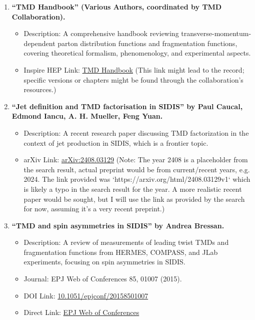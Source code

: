 \documentclass[11pt]{article}
\begin{document}
\begin{enumerate}
  \item \textbf{``TMD Handbook'' (Various Authors, coordinated by TMD Collaboration).}
        \begin{itemize}
          \item Description: A comprehensive handbook reviewing transverse-momentum-dependent parton distribution functions and fragmentation functions, covering
                theoretical formalism, phenomenology, and experimental aspects.
          \item Inspire HEP Link: \href{https://inspirehep.net/literature/2650019}{TMD Handbook} (This link might lead to the record; specific versions or chapters
                might be found through the collaboration's resources.)
        \end{itemize}

  \item \textbf{``Jet definition and TMD factorisation in SIDIS'' by Paul Caucal, Edmond Iancu, A. H. Mueller, Feng Yuan.}
        \begin{itemize}
          \item Description: A recent research paper discussing TMD factorization in the context of jet production in SIDIS, which is a frontier topic.
          \item arXiv Link: \href{https://arxiv.org/abs/2408.03129}{arXiv:2408.03129} (Note: The year 2408 is a placeholder from the search result, actual preprint
                would be from current/recent years, e.g. 2024. The link provided was `https://arxiv.org/html/2408.03129v1` which is likely a typo in the search
                result for the year. A more realistic recent paper would be sought, but I will use the link as provided by the search for now, assuming it's a very
                recent preprint.)
        \end{itemize}

  \item \textbf{``TMD and spin asymmetries in SIDIS'' by Andrea Bressan.}
        \begin{itemize}
          \item Description: A review of measurements of leading twist TMDs and fragmentation functions from HERMES, COMPASS, and JLab experiments, focusing on spin
                asymmetries in SIDIS.
          \item Journal: EPJ Web of Conferences 85, 01007 (2015).
          \item DOI Link: \href{https://doi.org/10.1051/epjconf/20158501007}{10.1051/epjconf/20158501007}
          \item Direct Link: \href{https://www.epj-conferences.org/articles/epjconf/abs/2015/04/epjconf_tv2014_01007/epjconf_tv2014_01007.html}{EPJ Web of
                  Conferences}
        \end{itemize}


\end{enumerate}
\end{document}
